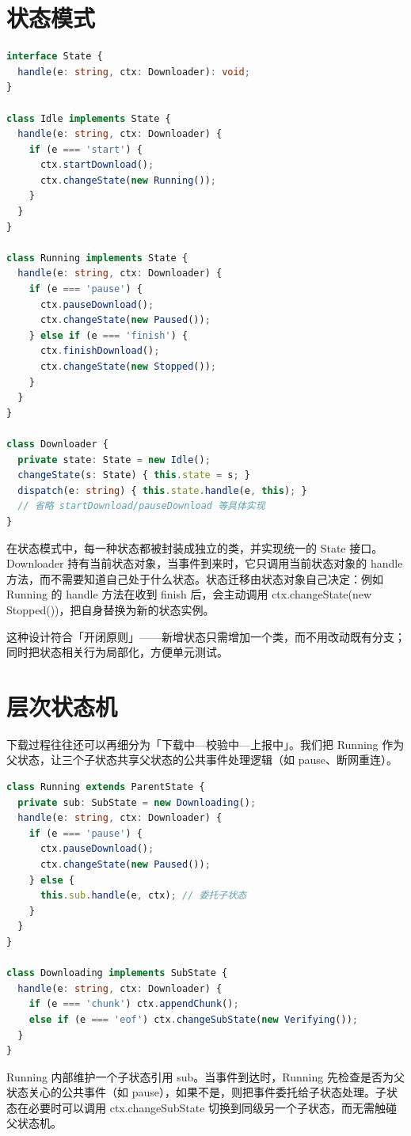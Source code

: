 \section{状态模式}
\begin{lstlisting}[language=ts]
interface State {
  handle(e: string, ctx: Downloader): void;
}

class Idle implements State {
  handle(e: string, ctx: Downloader) {
    if (e === 'start') {
      ctx.startDownload();
      ctx.changeState(new Running());
    }
  }
}

class Running implements State {
  handle(e: string, ctx: Downloader) {
    if (e === 'pause') {
      ctx.pauseDownload();
      ctx.changeState(new Paused());
    } else if (e === 'finish') {
      ctx.finishDownload();
      ctx.changeState(new Stopped());
    }
  }
}

class Downloader {
  private state: State = new Idle();
  changeState(s: State) { this.state = s; }
  dispatch(e: string) { this.state.handle(e, this); }
  // 省略 startDownload/pauseDownload 等具体实现
}
\end{lstlisting}
在状态模式中，每一种状态都被封装成独立的类，并实现统一的 State 接口。Downloader 持有当前状态对象，当事件到来时，它只调用当前状态对象的 handle 方法，而不需要知道自己处于什么状态。状态迁移由状态对象自己决定：例如 Running 的 handle 方法在收到 finish 后，会主动调用 ctx.changeState(new Stopped())，把自身替换为新的状态实例。\par
这种设计符合「开闭原则」——新增状态只需增加一个类，而不用改动既有分支；同时把状态相关行为局部化，方便单元测试。\par
\section{层次状态机}
下载过程往往还可以再细分为「下载中—校验中—上报中」。我们把 Running 作为父状态，让三个子状态共享父状态的公共事件处理逻辑（如 pause、断网重连）。\par
\begin{lstlisting}[language=ts]
class Running extends ParentState {
  private sub: SubState = new Downloading();
  handle(e: string, ctx: Downloader) {
    if (e === 'pause') {
      ctx.pauseDownload();
      ctx.changeState(new Paused());
    } else {
      this.sub.handle(e, ctx); // 委托子状态
    }
  }
}

class Downloading implements SubState {
  handle(e: string, ctx: Downloader) {
    if (e === 'chunk') ctx.appendChunk();
    else if (e === 'eof') ctx.changeSubState(new Verifying());
  }
}
\end{lstlisting}
Running 内部维护一个子状态引用 sub。当事件到达时，Running 先检查是否为父状态关心的公共事件（如 pause），如果不是，则把事件委托给子状态处理。子状态在必要时可以调用 ctx.changeSubState 切换到同级另一个子状态，而无需触碰父状态机。\par

